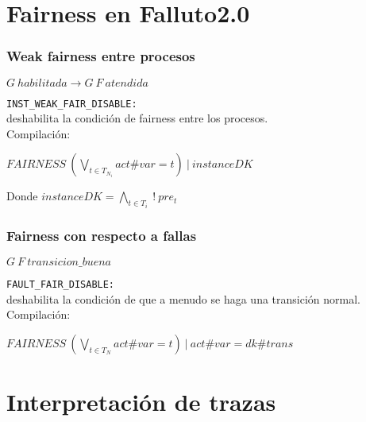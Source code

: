 \documentclass[serif]{beamer}
\begin{document}
\section[Fairness]{Fairness en Falluto2.0}

\begin{frame}
\frametitle{Weak fairness entre procesos}

\begin{framed}
$G~habilitada \rightarrow G~F~atendida$
\end{framed}

\texttt{INST\_WEAK\_FAIR\_DISABLE:}\\[0.3cm]
deshabilita la condición de fairness entre los procesos.\\[0.3cm]
Compilación:
\begin{framed}
$FAIRNESS~(\bigvee_{t \in T_{N_i}} act\#var = t)~|~instanceDK$
\end{framed}
Donde $instanceDK = \bigwedge_{t \in T_i}~!~pre_t~$
\end{frame}


\begin{frame}
\frametitle{Fairness con respecto a fallas}
\begin{framed}
$G~F~transicion\_buena$
\end{framed}
\texttt{FAULT\_FAIR\_DISABLE:}\\[0.3cm]
deshabilita la condición de que a menudo se haga una transición normal.\\[0.3cm]
Compilación:
\begin{framed}
$FAIRNESS~(\bigvee_{t \in {T_N}} act\#var = t)~|~act\#var = dk\#trans$
\end{framed}

\end{frame}

\section[Trazas]{Interpretación de trazas}
\end{document}
